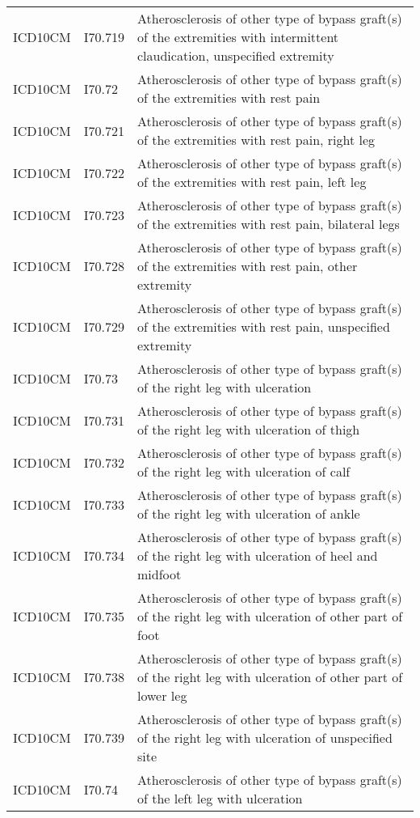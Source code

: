 \begin{longtable}{p{}p{}p{}}
  ICD10CM & I70.719 & Atherosclerosis of other type of bypass graft(s) of the extremities with intermittent claudication, unspecified extremity \\ 
  ICD10CM & I70.72 & Atherosclerosis of other type of bypass graft(s) of the extremities with rest pain \\ 
  ICD10CM & I70.721 & Atherosclerosis of other type of bypass graft(s) of the extremities with rest pain, right leg \\ 
  ICD10CM & I70.722 & Atherosclerosis of other type of bypass graft(s) of the extremities with rest pain, left leg \\ 
  ICD10CM & I70.723 & Atherosclerosis of other type of bypass graft(s) of the extremities with rest pain, bilateral legs \\ 
  ICD10CM & I70.728 & Atherosclerosis of other type of bypass graft(s) of the extremities with rest pain, other extremity \\ 
  ICD10CM & I70.729 & Atherosclerosis of other type of bypass graft(s) of the extremities with rest pain, unspecified extremity \\ 
  ICD10CM & I70.73 & Atherosclerosis of other type of bypass graft(s) of the right leg with ulceration \\ 
  ICD10CM & I70.731 & Atherosclerosis of other type of bypass graft(s) of the right leg with ulceration of thigh \\ 
  ICD10CM & I70.732 & Atherosclerosis of other type of bypass graft(s) of the right leg with ulceration of calf \\ 
  ICD10CM & I70.733 & Atherosclerosis of other type of bypass graft(s) of the right leg with ulceration of ankle \\ 
  ICD10CM & I70.734 & Atherosclerosis of other type of bypass graft(s) of the right leg with ulceration of heel and midfoot \\ 
  ICD10CM & I70.735 & Atherosclerosis of other type of bypass graft(s) of the right leg with ulceration of other part of foot \\ 
  ICD10CM & I70.738 & Atherosclerosis of other type of bypass graft(s) of the right leg with ulceration of other part of lower leg \\ 
  ICD10CM & I70.739 & Atherosclerosis of other type of bypass graft(s) of the right leg with ulceration of unspecified site \\ 
  ICD10CM & I70.74 & Atherosclerosis of other type of bypass graft(s) of the left leg with ulceration \\ 

\end{longtable}
